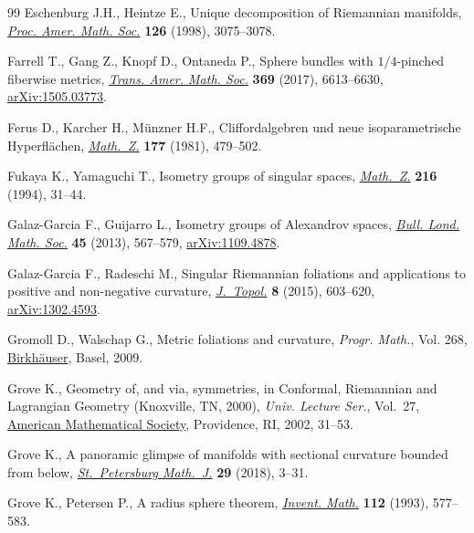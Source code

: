 \documentclass[pdftex]{sigma}
\numberwithin{equation}{section}
\theoremstyle{definition}
\begin{document}
\begin{thebibliography}{99}
Eschenburg J.H., Heintze E., Unique decomposition of {R}iemannian manifolds,
 \href{https://doi.org/10.1090/S0002-9939-98-04630-9}{\textit{Proc. Amer.
 Math. Soc.}} \textbf{126} (1998), 3075--3078.

Farrell T., Gang Z., Knopf D., Ontaneda P., Sphere bundles with {$1/4$}-pinched
 fiberwise metrics, \href{https://doi.org/10.1090/tran/6993}{\textit{Trans.
 Amer. Math. Soc.}} \textbf{369} (2017), 6613--6630,
 \href{http://arxiv.org/abs/1505.03773}{arXiv:1505.03773}.

Ferus D., Karcher H., M\"unzner H.F., Cliffordalgebren und neue
 isoparametrische {H}yperfl\"achen,
 \href{https://doi.org/10.1007/BF01219082}{\textit{Math.~Z.}} \textbf{177}
 (1981), 479--502.

Fukaya K., Yamaguchi T., Isometry groups of singular spaces,
 \href{https://doi.org/10.1007/BF02572307}{\textit{Math.~Z.}} \textbf{216}
 (1994), 31--44.

Galaz-Garcia F., Guijarro L., Isometry groups of {A}lexandrov spaces,
 \href{https://doi.org/10.1112/blms/bds101}{\textit{Bull. Lond. Math. Soc.}}
 \textbf{45} (2013), 567--579,
 \href{http://arxiv.org/abs/1109.4878}{arXiv:1109.4878}.

Galaz-Garcia F., Radeschi M., Singular {R}iemannian foliations and applications
 to positive and non-negative curvature,
 \href{https://doi.org/10.1112/jtopol/jtv004}{\textit{J.~Topol.}} \textbf{8}
 (2015), 603--620, \href{http://arxiv.org/abs/1302.4593}{arXiv:1302.4593}.

Gromoll D., Walschap G., Metric foliations and curvature, \textit{Progr.
 Math.}, Vol. 268,
 \href{https://doi.org/10.1007/978-3-7643-8715-0}{Birkh\"auser}, Basel, 2009.

Grove K., Geometry of, and via, symmetries, in Conformal, {R}iemannian and
 {L}agrangian {G}eometry ({K}noxville, {TN}, 2000), \textit{Univ. Lecture
 Ser.}, Vol.~27, \href{https://doi.org/10.1090/ulect/027/02}{American
 Mathematical Society}, Providence, RI, 2002, 31--53.

Grove K., A panoramic glimpse of manifolds with sectional curvature bounded
 from below, \href{https://doi.org/10.1090/spmj/1479}{\textit{St.~Petersburg
 Math.~J.}} \textbf{29} (2018), 3--31.

Grove K., Petersen P., A radius sphere theorem,
 \href{https://doi.org/10.1007/BF01232447}{\textit{Invent. Math.}}
 \textbf{112} (1993), 577--583.


\end{thebibliography}
\end{document}
